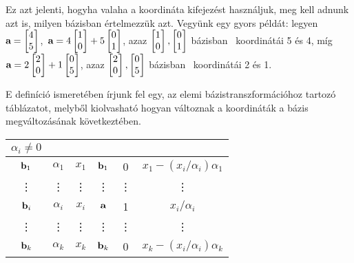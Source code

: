 \documentclass[a4paper,11.5pt]{article}
\begin{document}
	Ez azt jelenti, hogyha valaha a koordináta kifejezést használjuk, meg kell adnunk azt is, milyen bázisban értelmezzük azt. Vegyünk egy gyors példát: legyen $\a=
		\begin{bmatrix}
			4\s\\
			5\s
		\end{bmatrix}$,\ 
		$\a=4
		\begin{bmatrix}
			1\s\\
			0\s
		\end{bmatrix}+5
		\begin{bmatrix}
			0\s\\
			1\s
		\end{bmatrix}$,  azaz 
		$\begin{bmatrix}
			1\s\\
			0\s\\
		\end{bmatrix},  
		\begin{bmatrix}
			0\s\\
			1\s\\
		\end{bmatrix}$ bázisban \a\ koordinátái 5 és 4, míg
	$\a=2
	\begin{bmatrix}
		2\s\\
		0\s
	\end{bmatrix}+1
	\begin{bmatrix}
		0\s\\
		5\s
	\end{bmatrix}$,
	   azaz
	$\begin{bmatrix}
		2\s\\
		0\s
	\end{bmatrix},
	\begin{bmatrix}
		0\s\\
		5\s
	\end{bmatrix}$
	   bázisban \a\ koordinátái 2 és 1.
	
	E definíció ismeretében írjunk fel egy, az elemi bázistranszformációhoz tartozó táblázatot, melyből kiolvasható hogyan változnak a koordináták a bázis megváltozásának következtében.
	
	\begin{center}
		\begin{tabular}{c|cc||c|cc}
			$\alpha_i\not=0$&\a&\x&&\a&\x\\
			\hline
			$\textbf{b}_1$&$\alpha_1$&$x_1$&$\textbf{b}_1$&0&$x_1-(x_i/\alpha_i)\alpha_1$\\
			\vdots&\vdots&\vdots&\vdots&\vdots&\vdots\\
			$\textbf{b}_i$&$\alpha_i$&$x_i$&$\textbf{a}$&1&$x_i/\alpha_i$\\
			\vdots&\vdots&\vdots&\vdots&\vdots&\vdots\\
			$\textbf{b}_k$&$\alpha_k$&$x_k$&$\textbf{b}_k$&0&$x_k-(x_i/\alpha_i)\alpha_k$\\
		\end{tabular}
	\end{center}
	
\end{document}
